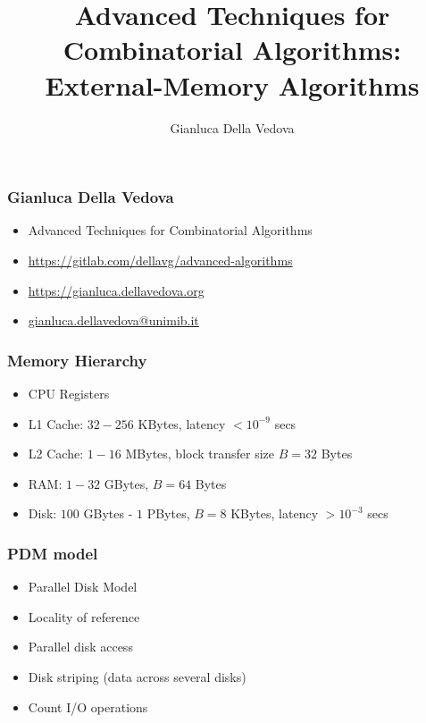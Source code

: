 \documentclass[12pt,aspectratio=169]{beamer}
\author{Gianluca Della Vedova}
\title[Advanced Algorithms]{Advanced Techniques for Combinatorial Algorithms:
External-Memory Algorithms}
\institute[]{Univ. Milano--Bicocca\\
  \texttt{https://gianluca.dellavedova.org}}
\begin{document}
\begin{frame}
  \titlepage
\end{frame}


\begin{frame}\frametitle{Gianluca Della Vedova}
  \begin{itemize}
  \item
                Advanced Techniques for Combinatorial Algorithms
\item
{\small\url{https://gitlab.com/dellavg/advanced-algorithms}}
  \item
{\small\url{https://gianluca.dellavedova.org}}
  \item
{\small\url{gianluca.dellavedova@unimib.it}}
  \end{itemize}
\end{frame}



\begin{frame}\frametitle{Memory Hierarchy}
  \begin{itemize}
  \item
    CPU Registers
  \item
    L1 Cache: $32-256$ KBytes, latency $< 10^{-9}$ secs
  \item
    L2 Cache: $1-16$ MBytes, block transfer size $B=32$ Bytes
  \item
    RAM: $1-32$ GBytes,  $B=64$ Bytes
  \item
    Disk: $100$ GBytes - $1$ PBytes,  $B=8$ KBytes, latency $> 10^{-3}$ secs
  \end{itemize}
\end{frame}


\begin{frame}\frametitle{PDM model}
  \begin{itemize}
  \item
    Parallel Disk Model
  \item
    Locality of reference
  \item
    Parallel disk access
  \item
    Disk striping (data across several disks)
  \item
    Count \alert{I/O operations}
  \end{itemize}
\end{frame}
\end{document}

